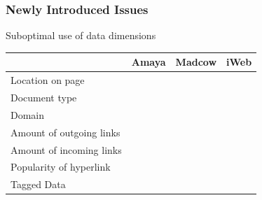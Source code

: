 \begin{frame}
\frametitle{Newly Introduced Issues}
	\begin{block}{Suboptimal use of data dimensions}
		\begin{center}
			\begin{tabular}{|l||c|c|c|}\hline
																	& Amaya    & Madcow   &  iWeb     \\ \hline \hline
				Location on page					& \textcolor{dgreen}{\cmark{}} & \textcolor{dgreen}{\cmark{}} &  \textcolor{dgreen}{\cmark{}} \\ \hline
				Document type 						& \textcolor{red}{\xmark{}} & \textcolor{dgreen}{\cmark{}} &  \textcolor{red}{\xmark{}} \\ \hline
				Domain										& \textcolor{red}{\xmark{}} & \textcolor{red}{\xmark{}} &  \textcolor{red}{\xmark{}} \\ \hline
				Amount of outgoing links	& \textcolor{red}{\xmark{}} & \textcolor{red}{\xmark{}} &  \textcolor{red}{\xmark{}} \\ \hline
				Amount of incoming links	& \textcolor{red}{\xmark{}} & \textcolor{red}{\xmark{}} &  \textcolor{red}{\xmark{}} \\ \hline
				Popularity of hyperlink		& \textcolor{red}{\xmark{}} & \textcolor{red}{\xmark{}} &  \textcolor{red}{\xmark{}} \\ \hline
				Tagged Data								& \textcolor{red}{\xmark{}} & \textcolor{red}{\xmark{}} &  \textcolor{dgreen}{\cmark{}} \\ \hline
			\end{tabular}
		\end{center}
	\end{block}
\end{frame}
